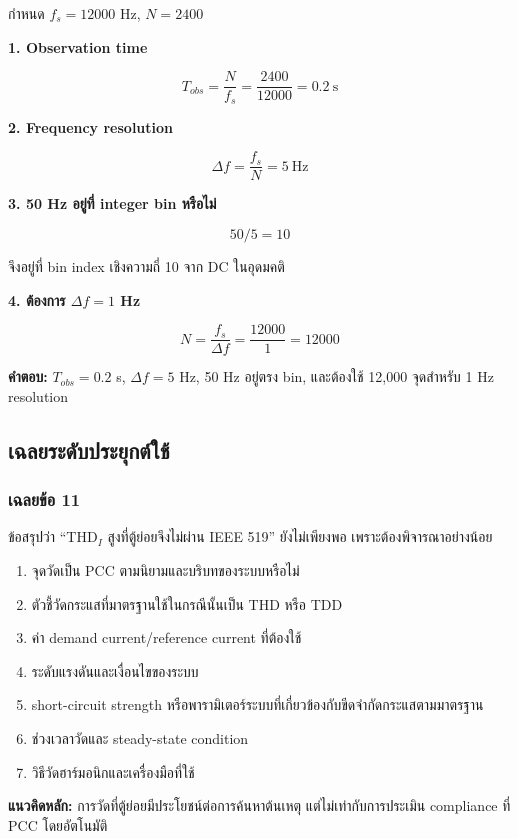 กำหนด $f_s=12000$ Hz, $N=2400$

\textbf{1. Observation time}

\[
T_{obs}=\frac{N}{f_s}=\frac{2400}{12000}=0.2\ \text{s}
\]

\textbf{2. Frequency resolution}

\[
\Delta f=\frac{f_s}{N}=5\ \text{Hz}
\]

\textbf{3. 50 Hz อยู่ที่ integer bin หรือไม่}

\[
50/5=10
\]

จึงอยู่ที่ bin index เชิงความถี่ 10 จาก DC ในอุดมคติ

\textbf{4. ต้องการ $\Delta f=1$ Hz}

\[
N=\frac{f_s}{\Delta f}=\frac{12000}{1}=12000
\]

\textbf{คำตอบ:} $T_{obs}=0.2$ s, $\Delta f=5$ Hz, 50 Hz อยู่ตรง bin, และต้องใช้ 12,000 จุดสำหรับ 1 Hz resolution



\subsection{เฉลยระดับประยุกต์ใช้}

\subsubsection{เฉลยข้อ 11}

ข้อสรุปว่า “THD$_I$ สูงที่ตู้ย่อยจึงไม่ผ่าน IEEE 519” ยังไม่เพียงพอ เพราะต้องพิจารณาอย่างน้อย

\begin{enumerate}
    \item จุดวัดเป็น PCC ตามนิยามและบริบทของระบบหรือไม่
    \item ตัวชี้วัดกระแสที่มาตรฐานใช้ในกรณีนั้นเป็น THD หรือ TDD
    \item ค่า demand current/reference current ที่ต้องใช้
    \item ระดับแรงดันและเงื่อนไขของระบบ
    \item short-circuit strength หรือพารามิเตอร์ระบบที่เกี่ยวข้องกับขีดจำกัดกระแสตามมาตรฐาน
    \item ช่วงเวลาวัดและ steady-state condition
    \item วิธีวัดฮาร์มอนิกและเครื่องมือที่ใช้
\end{enumerate}

\textbf{แนวคิดหลัก:} การวัดที่ตู้ย่อยมีประโยชน์ต่อการค้นหาต้นเหตุ แต่ไม่เท่ากับการประเมิน compliance ที่ PCC โดยอัตโนมัติ

